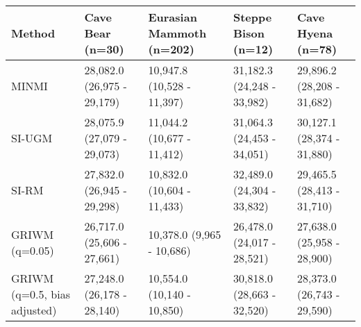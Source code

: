 
\begin{tabular}{lllll}
\toprule
Method & Cave Bear (n=30) & Eurasian Mammoth (n=202) & Steppe Bison (n=12) & Cave Hyena (n=78)\\
\midrule
MINMI & 28,082.0 (26,975 - 29,179) & 10,947.8 (10,528 - 11,397) & 31,182.3 (24,248 - 33,982) & 29,896.2 (28,208 - 31,682)\\
SI-UGM & 28,075.9 (27,079 - 29,073) & 11,044.2 (10,677 - 11,412) & 31,064.3 (24,453 - 34,051) & 30,127.1 (28,374 - 31,880)\\
SI-RM & 27,832.0 (26,945 - 29,298) & 10,832.0 (10,604 - 11,433) & 32,489.0 (24,304 - 33,832) & 29,465.5 (28,413 - 31,710)\\
GRIWM (q=0.05) & 26,717.0 (25,606 - 27,661) & 10,378.0 (9,965 - 10,686) & 26,478.0 (24,017 - 28,521) & 27,638.0 (25,958 - 28,900)\\
GRIWM (q=0.5, bias adjusted) & 27,248.0 (26,178 - 28,140) & 10,554.0 (10,140 - 10,850) & 30,818.0 (28,663 - 32,520) & 28,373.0 (26,743 - 29,590)\\
\bottomrule
\end{tabular}
